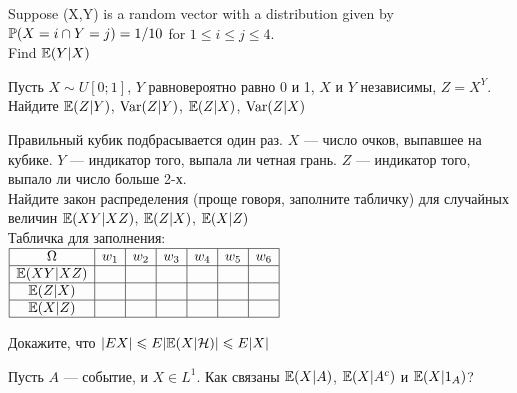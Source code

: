 \begin{problem}
Suppose (X,Y) is a random vector with a distribution given by $\P(X=i \cap Y=j)=1/10$  for $1\le i\le j\le 4$. \\
Find $\E(Y|X)$ 
\end{problem} 
\begin{solution} 

\end{solution}

\begin{problem}
Пусть $X\sim U[0;1]$, $Y$ равновероятно равно 0 и 1, $X$ и $Y$ независимы, $Z=X^{Y}$.
Найдите $\E(Z|Y)$, $\Var(Z|Y)$, $\E(Z|X)$, $\Var(Z|X)$ 
\end{problem} 
\begin{solution} 

\end{solution}

\begin{problem}
 Правильный кубик подбрасывается один раз. $X$ --- число очков, выпавшее на кубике. $Y$ --- индикатор того, выпала ли четная грань. $Z$ --- индикатор того, выпало ли число больше 2-х. \\
Найдите закон распределения (проще говоря, заполните табличку) для случайных величин $\E(XY|XZ)$, $\E(Z|X)$, $\E(X|Z)$ \\
Табличка для заполнения: \\
$\begin{array}{|c|c|c|c|c|c|c|} 
\hline
\Omega & w_{1} & w_{2} & w_{3} & w_{4} & w_{5} & w_{6} \\
\hline
\E(XY|XZ) & & & & & & \\
\hline
\E(Z|X) & & & & & & \\
\hline
\E(X|Z) & & & & & & \\
\hline
\end{array}$
\end{problem} 
\begin{solution} 

\end{solution}

\begin{problem}
Докажите, что $|EX|\le E|\E(X|\mathcal{H})|\le E|X|$ 
\end{problem} 
\begin{solution} 

\end{solution}

\begin{problem}
Пусть $A$ --- событие, и $X\in L^{1}$. Как связаны $\E(X|A)$,
$\E(X|A^{c})$ и $\E(X|1_{A})$? 
\end{problem} 
\begin{solution} 

\end{solution}

